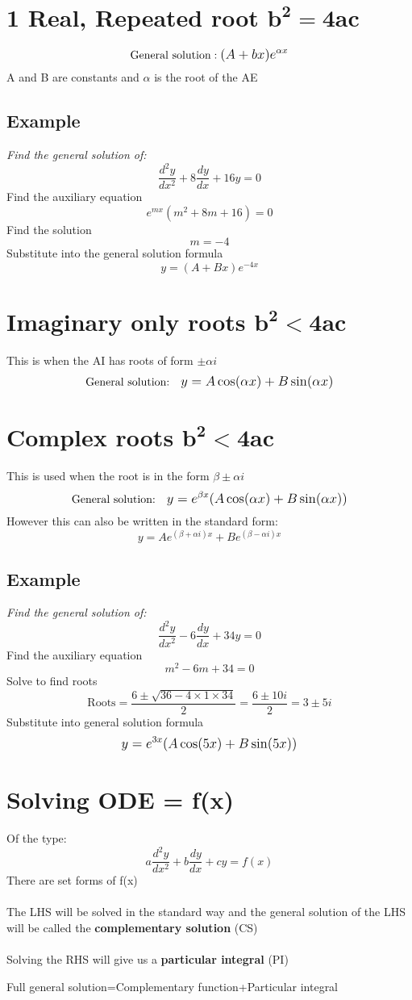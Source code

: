 \documentclass{article}[18pt]
\begin{document}
\section{1 Real, Repeated root $\mathbf{b^2=4ac}$}
$$\textrm{General solution}: \mathlarger{(A+bx)e^{\alpha x}}$$
A and B are constants and $\alpha$ is the root of the AE
\subsection{Example}
\textit{Find the general solution of:}
$$\frac{d^2y}{dx^2}+8\frac{dy}{dx}+16y=0$$
Find the auxiliary equation
$$e^{mx}(m^2+8m+16)=0$$
Find the solution
$$m=-4$$
Substitute into the general solution formula
$$y=(A+Bx)e^{-4x}$$
\section{Imaginary only roots $\mathbf{b^2<4ac}$}
This is when the AI has roots of form $\pm \alpha i$
$$\textrm{General solution:} \quad \mathlarger{y=A\cos(\alpha x)+B\sin(\alpha x)}$$
\newpage
\section{Complex roots $\mathbf{b^2<4ac}$}
This is used when the root is in the form $\beta\pm\alpha i$
$$\textrm{General solution:} \quad \mathlarger{y=e^{\beta x}(A\cos(\alpha x)+B\sin(\alpha x))}$$
However this can also be written in the standard form:
{\Large
$$y=Ae^{(\beta+\alpha i)x}+Be^{(\beta-\alpha i)x}$$}
\subsection{Example}
\textit{Find the general solution of:}
$$\frac{d^2y}{dx^2}-6\frac{dy}{dx}+34y=0$$
Find the auxiliary equation
$$m^2-6m+34=0$$
Solve to find roots
$$\textrm{Roots}=\frac{6\pm\sqrt{36-4\times1\times34}}{2}=\frac{6\pm10i}{2}=3\pm5i$$
Substitute into general solution formula
$$\mathlarger{y=e^{3x}(A\cos(5x)+B\sin(5x))}$$
\section{Solving  ODE = f(x)}
Of the type:
$$a\frac{d^2y}{dx^2}+b\frac{dy}{dx}+cy=f(x)$$
There are set forms of f(x)\\
\\
The LHS will be solved in the standard way and the general solution of the LHS will be called the \textbf{complementary solution} (CS)\\
\\
Solving the RHS will give us a \textbf{particular integral} (PI)
\begin{center}
Full general solution=Complementary function+Particular integral
\end{center}
\end{document}
